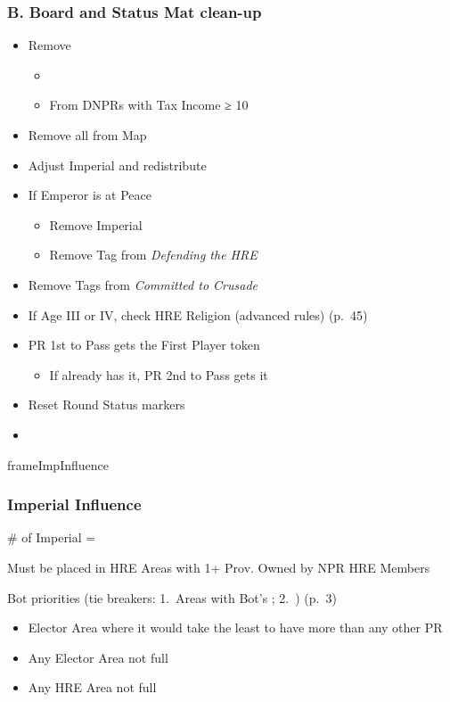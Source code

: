 \documentclass[10pt]{article}
\begin{document}
\subsubsection*{B. Board and Status Mat clean-up}
\begin{itemize}
	\item Remove \alliances
	\begin{itemize}
		\item {}
		\item From DNPRs with Tax Income ≥ 10\ducats
	\end{itemize}
	\item Remove all \plague from Map
	\item {}Adjust Imperial \influence and redistribute
	\item If Emperor is at Peace
	\begin{itemize}
		\item Remove Imperial \manpower
		\item Remove Tag from \emph{Defending the HRE}
	\end{itemize}
	\item Remove Tags from \emph{Committed to Crusade}
	\item {}If Age III or IV, check HRE Religion (advanced rules) (p.~45)
	\item PR 1st to Pass gets the First Player token
	\begin{itemize}
		\item If already has it, PR 2nd to Pass gets it
	\end{itemize}
	\item Reset Round Status markers
	\item {}
\end{itemize}
\begin{dynamiccontents*}{frameImpInfluence}
	\subsubsection*{Imperial Influence }
	\begin{itemize}
		\item \# of Imperial \influence = \authority
		\item Must be placed in HRE Areas with 1+ Prov. Owned by NPR HRE Members
		{\botrules
		\item Bot priorities (tie breakers: 1. Areas with Bot's \allies; 2. \az) (p.~3)
		\begin{itemize}
			\item Elector Area where it would take the least \influence to have more \influence than any other PR
			\item Any Elector Area not full
			\item Any HRE Area not full
		\end{itemize}
		}
	\end{itemize}
\end{dynamiccontents*}
\end{document}

